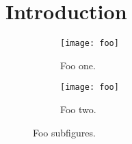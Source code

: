 \section{Introduction}
\label{introduction}

\lipsum[1]

\begin{figure}[!h]

\begin{subfigure}{\columnwidth}
\texttt{[image: foo]} 
\caption{Foo one.}
\label{fig:foo_sub_one}
\end{subfigure}

\begin{subfigure}{\columnwidth}
\texttt{[image: foo]}
\caption{Foo two.}
\label{fig:foo_sub_two}
\end{subfigure}
 
\caption{Foo subfigures.}
\label{fig:foo_sub}
\end{figure}


\lipsum[1]


\lipsum[1]
